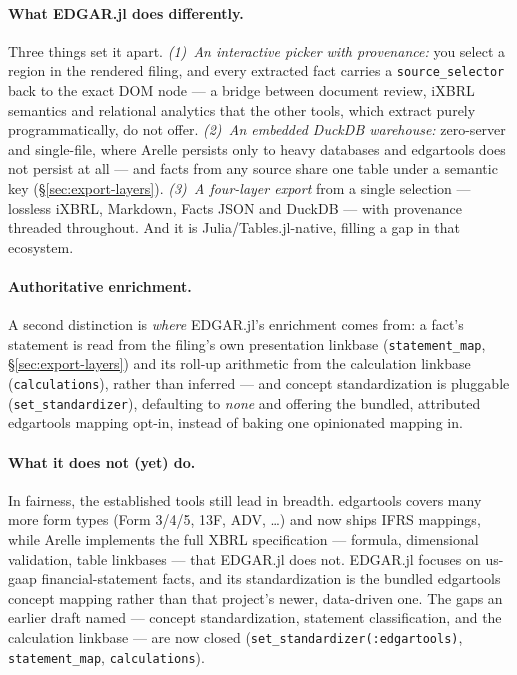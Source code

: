 \documentclass[11pt,a4paper]{report}
\begin{document}
\paragraph{What EDGAR.jl does differently.} Three things set it apart. \emph{(1)~An interactive
picker with provenance:} you select a region in the rendered filing, and every extracted fact
carries a \texttt{source\_selector} back to the exact DOM node --- a bridge between document
review, iXBRL semantics and relational analytics that the other tools, which extract purely
programmatically, do not offer. \emph{(2)~An embedded DuckDB warehouse:} zero-server and
single-file, where Arelle persists only to heavy databases and edgartools does not persist at
all --- and facts from any source share one table under a semantic key
(\S\ref{sec:export-layers}). \emph{(3)~A four-layer export} from a single selection --- lossless
iXBRL, Markdown, Facts JSON and DuckDB --- with provenance threaded throughout. And it is
Julia/Tables.jl-native, filling a gap in that ecosystem.

\paragraph{Authoritative enrichment.} A second distinction is \emph{where} EDGAR.jl's enrichment
comes from: a fact's statement is read from the filing's own presentation linkbase
(\texttt{statement\_map}, \S\ref{sec:export-layers}) and its roll-up arithmetic from the
calculation linkbase (\texttt{calculations}), rather than inferred --- and concept standardization
is pluggable (\texttt{set\_standardizer}), defaulting to \emph{none} and offering the bundled,
attributed edgartools mapping opt-in, instead of baking one opinionated mapping in.

\paragraph{What it does not (yet) do.} In fairness, the established tools still lead in breadth.
edgartools covers many more form types (Form 3/4/5, 13F, ADV, \dots) and now ships IFRS mappings,
while Arelle implements the full XBRL specification --- formula, dimensional validation, table
linkbases --- that EDGAR.jl does not. EDGAR.jl focuses on us-gaap financial-statement facts, and
its standardization is the bundled edgartools concept mapping rather than that project's newer,
data-driven one. The gaps an earlier draft named --- concept standardization, statement
classification, and the calculation linkbase --- are now closed
(\texttt{set\_standardizer(:edgartools)}, \texttt{statement\_map}, \texttt{calculations}).
\end{document}

